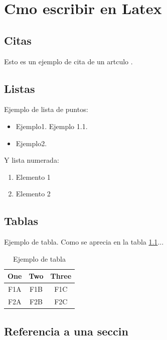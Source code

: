 \chapter{Cmo escribir en Latex}

\section{Citas}


Esto es un ejemplo de cita de un artculo \cite{Brunete:2013}.


\section{Listas}

Ejemplo de lista de puntos:
\begin{itemize}
\item Ejemplo1.
    \subitem Ejemplo 1.1.
\item Ejemplo2.
\end{itemize}

Y lista numerada:
\begin{enumerate}
\item Elemento 1
\item Elemento 2
\end{enumerate}

\section{Tablas}

Ejemplo de tabla. Como se aprecia en la tabla \ref{tab:table_example}...
\begin{table}[tb]
\caption{Ejemplo de tabla}
\label{tab:table_example}
\begin{center}
\begin{tabular}{|c||c|c|}
\hline
One & Two & Three\\
\hline
F1A & F1B & F1C\\
F2A & F2B & F2C\\
\hline
\end{tabular}
\end{center}
\end{table}

\section{Referencia a una seccin}
\label{sec:refsec}

